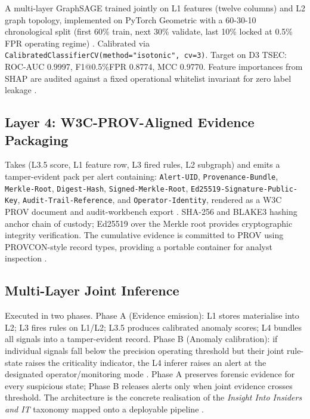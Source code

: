 A multi-layer GraphSAGE trained jointly on L1 features (twelve columns) and L2 graph topology, implemented on PyTorch Geometric with a 60-30-10 chronological split (first 60\% train, next 30\% validate, last 10\% locked at 0.5\% FPR operating regime) \citep{gao2023dtgi, li2023tgcnda, xiao2024sentinel, xiao2022robust}. Calibrated via \texttt{CalibratedClassifierCV\allowbreak(method="isotonic", cv=3)}. Target on D3 TSEC: ROC-AUC 0.9997, F1@0.5\%FPR 0.8774, MCC 0.9770. Feature importances from SHAP are audited against a fixed operational whitelist invariant for zero label leakage \citep{li2021threat, mavroeidis2018framework}.

\subsection{Layer 4: W3C-PROV-Aligned Evidence Packaging}

Takes (L3.5 score, L1 feature row, L3 fired rules, L2 \newline subgraph) and emits a tamper-evident pack per alert containing: \texttt{Alert-\allowbreak UID}, \texttt{Provenance-\allowbreak Bundle}, \texttt{Merkle-\allowbreak Root}, \texttt{Digest-\allowbreak Hash}, \texttt{Signed-\allowbreak Merkle-\allowbreak Root}, \texttt{Ed25519-\allowbreak Signature-\allowbreak Public-\allowbreak Key}, \newline \texttt{Audit-\allowbreak Trail-\allowbreak Reference}, and \texttt{Operator-\allowbreak Identity}, rendered as a W3C PROV document and audit-workbench export \citep{aki2025provenance, li2021threat, mavroeidis2018framework, shoderu2025dfrsaas, yusof2025provcon}. SHA-256 and BLAKE3 hashing anchor chain of custody; Ed25519 over the Merkle root provides cryptographic integrity verification. The cumulative evidence is committed to PROV using PROVCON-style record types, providing a portable container for analyst inspection \citep{shoderu2025dfrsaas, yusof2025provcon}.

\subsection{Multi-Layer Joint Inference}

Executed in two phases. Phase A (Evidence emission): L1 stores materialise into L2; L3 fires rules on L1/L2; L3.5 produces calibrated anomaly scores; L4 bundles all signals into a tamper-evident record. Phase B (Anomaly calibration): if individual signals fall below the precision operating threshold but their joint rule-state raises the criticality indicator, the L4 inferer raises an alert at the designated operator/monitoring mode \citep{kurniawan2022krystal, mavroeidis2018framework, ren2022cskg4apt}. Phase A preserves forensic evidence for every suspicious state; Phase B releases alerts only when joint evidence crosses threshold. The architecture is the concrete realisation of the \textit{Insight Into Insiders and IT} taxonomy mapped onto a deployable pipeline \citep{li2021threat, mavroeidis2018framework, ren2022cskg4apt}.
